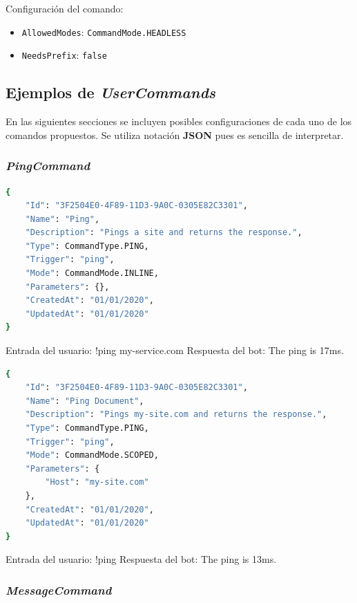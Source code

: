 Configuración del comando:

\begin{itemize}
	\item \verb|AllowedModes|: \verb|CommandMode.HEADLESS|
	\item \verb|NeedsPrefix|: \verb|false|
\end{itemize}


\subsection{Ejemplos de \textit{UserCommands}}

En las siguientes secciones se incluyen posibles configuraciones de cada uno de los comandos propuestos. Se utiliza notación \textbf{JSON} pues es sencilla de interpretar.

\subsubsection{\textit{PingCommand}}

\begin{lstlisting}[language=sh]
{
    "Id": "3F2504E0-4F89-11D3-9A0C-0305E82C3301",
    "Name": "Ping",
    "Description": "Pings a site and returns the response.",
    "Type": CommandType.PING,
    "Trigger": "ping",
    "Mode": CommandMode.INLINE,
    "Parameters": {},
    "CreatedAt": "01/01/2020",
    "UpdatedAt": "01/01/2020"
}
\end{lstlisting}

Entrada del usuario: !ping my-service.com
Respuesta del bot: The ping is 17ms.

\begin{lstlisting}[language=sh]
{
    "Id": "3F2504E0-4F89-11D3-9A0C-0305E82C3301",
    "Name": "Ping Document",
    "Description": "Pings my-site.com and returns the response.",    
    "Type": CommandType.PING,
    "Trigger": "ping",
    "Mode": CommandMode.SCOPED,
    "Parameters": {
        "Host": "my-site.com"
    },
    "CreatedAt": "01/01/2020",
    "UpdatedAt": "01/01/2020"
}
\end{lstlisting}

Entrada del usuario: !ping
Respuesta del bot: The ping is 13ms.



\subsubsection{\textit{MessageCommand}}

